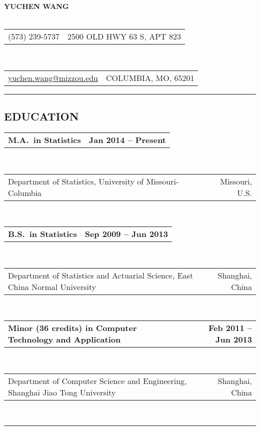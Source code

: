 \documentclass[10pt]{article}
\makeatletter
\newcommand{\headerrow}[2]
{\begin{tabular*}{\linewidth}{l@{\extracolsep{\fill}}r}
	#1 &
	#2 \\
\end{tabular*}}
\makeatother
\begin{document}
\begin{center}
{\LARGE \textbf{YUCHEN WANG\\
\ }}
	\headerrow
	{(573) 239-5737}
	{2500 OLD HWY 63 S, APT 823}
	\\
	\headerrow
	{\href{mailto://yuchen.wang@mizzou.edu}{yuchen.wang@mizzou.edu}}
	{COLUMBIA, MO, 65201}
\end{center}


% 


\hrule
\vspace{-0.4em}


\subsection*{\centering EDUCATION}

\headerrow
	{\textbf{M.A.~in Statistics}}
	{\textbf{Jan 2014 – Present}}
\\
\headerrow
	{Department of Statistics, University of Missouri-Columbia}
	{Missouri, U.S.}
\\
\headerrow
	{\textbf{B.S.~in Statistics}}
	{\textbf{Sep 2009 – Jun 2013}}
\\
\headerrow
	{Department of Statistics and Actuarial Science, East China Normal University}
	{Shanghai, China}
\\
\headerrow
	{\textbf{Minor (36 credits) in Computer Technology and Application}}
	{\textbf{Feb 2011 – Jun 2013}}
\\
\headerrow
	{Department of Computer Science and Engineering, Shanghai Jiao Tong University}
	{Shanghai, China}
\\


\hrule
\vspace{-0.4em}
\end{document}
